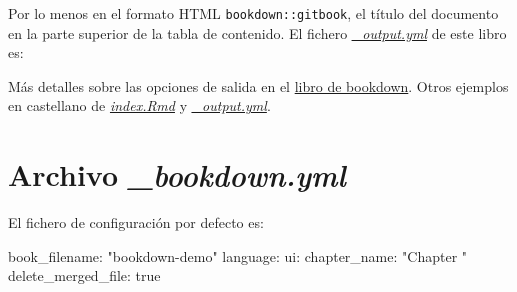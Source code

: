 \documentclass[]{book}
\newenvironment{Shaded}{\begin{snugshade}}{\end{snugshade}}
\newcommand{\StringTok}[1]{\textcolor[rgb]{0.31,0.60,0.02}{#1}}
\newcommand{\CommentTok}[1]{\textcolor[rgb]{0.56,0.35,0.01}{\textit{#1}}}
\newcommand{\FunctionTok}[1]{\textcolor[rgb]{0.00,0.00,0.00}{#1}}
\newcommand{\AttributeTok}[1]{\textcolor[rgb]{0.77,0.63,0.00}{#1}}
\newcommand{\ErrorTok}[1]{\textcolor[rgb]{0.64,0.00,0.00}{\textbf{#1}}}
\newcommand{\NormalTok}[1]{#1}
\theoremstyle{definition}
\theoremstyle{definition}
\theoremstyle{definition}
\theoremstyle{remark}
\begin{document}
Por lo menos en el formato HTML \texttt{bookdown::gitbook}, el título
del documento en la parte superior de la tabla de contenido. El fichero
\href{https://github.com/rubenfcasal/bookdown_intro/blob/master/_output.yml}{\emph{\_output.yml}}
de este libro es:

\begin{Shaded}
\end{Shaded}

Más detalles sobre las opciones de salida en el
\href{https://bookdown.org/yihui/bookdown/output-formats.html}{libro de
bookdown}. Otros ejemplos en castellano de
\href{https://github.com/rubenfcasal/simbook/raw/master/index.Rmd}{\emph{index.Rmd}}
y
\href{https://github.com/rubenfcasal/simbook/blob/master/_output.yml}{\emph{\_output.yml}}.

\section{\texorpdfstring{Archivo
\emph{\_bookdown.yml}}{Archivo \_bookdown.yml}}\label{archivo-_bookdown.yml}

El fichero de configuración por defecto es:

\begin{Shaded}
\begin{Highlighting}[]
\FunctionTok{book_filename:}\AttributeTok{ }\StringTok{"bookdown-demo"}
\FunctionTok{language:}
  \FunctionTok{ui:}
    \FunctionTok{chapter_name:}\AttributeTok{ }\StringTok{"Chapter "}
\FunctionTok{delete_merged_file:}\AttributeTok{ true    }
\end{Highlighting}
\end{Shaded}
\end{document}
